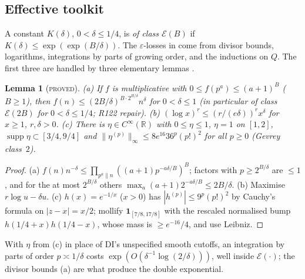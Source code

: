 \documentclass[10pt,reqno]{amsart}
\newtheorem{lemma}[theorem]{Lemma}
\theoremstyle{definition}
\numberwithin{equation}{section}
\newcommand{\R}{\mathbb R}
\newcommand{\ind}{\mathbf 1}
\newcommand{\status}[1]{\textup{\textsc{#1}}}
\begin{document}
\subsection{Effective toolkit}
A constant $K(\delta)$, $0<\delta\le1/4$, is \emph{of class $\mathcal E(B)$}
if $K(\delta)\le\exp(\exp(B/\delta))$. The $\varepsilon$-losses in
\cite{DI,Dr} come from divisor bounds, logarithms, integrations by parts
of growing order, and the inductions on $Q$. The first three are handled by
three elementary lemmas \cite[\S1]{TTL3}.

\begin{lemma}[\status{proved}]\label{A:tools}
\textup{(a)} If $f$ is multiplicative with $0\le f(p^a)\le(a+1)^B$ \textup($B\ge1$\textup),
then $f(n)\le(2B/\delta)^{B\cdot2^{B/\delta}}n^\delta$ for $0<\delta\le1$
\textup(in particular of class $\mathcal E(2B)$ for $0<\delta\le1/4$; R122 repair\textup).
\textup{(b)} $(\log x)^r\le(r/(e\delta))^rx^\delta$ for $x\ge1$, $r,\delta>0$.
\textup{(c)} There is $\eta\in C^\infty(\R)$ with $0\le\eta\le1$, $\eta=1$ on $[1,2]$,
$\operatorname{supp}\eta\subset[3/4,9/4]$ and $\|\eta^{(p)}\|_\infty\le8e^{16}36^p(p!)^2$
for all $p\ge0$ \textup(Gevrey class~$2$\textup).
\end{lemma}
\begin{proof}
(a) $f(n)n^{-\delta}\le\prod_{p^a\|n}((a+1)p^{-a\delta/B})^B$; factors with
$p\ge2^{B/\delta}$ are $\le1$, and for the at most $2^{B/\delta}$ others
$\max_a(a+1)2^{-a\delta/B}\le2B/\delta$. (b) Maximise $r\log u-\delta u$.
(c) $h(x)=e^{-1/x}$ ($x>0$) has $|h^{(p)}|\le9^p(p!)^2$ by Cauchy's formula on
$|z-x|=x/2$; mollify $\ind_{[7/8,17/8]}$ with the rescaled normalised bump
$h(1/4+x)h(1/4-x)$, whose mass is $\ge e^{-16}/4$, and use Leibniz.
\end{proof}
With $\eta$ from (c) in place of DI's unspecified smooth cutoffs, an
integration by parts of order $p\asymp1/\delta$ costs
$\exp(O(\delta^{-1}\log(2/\delta)))$, well inside $\mathcal E(\cdot)$; the
divisor bounds (a) are what produce the double exponential.
\end{document}
